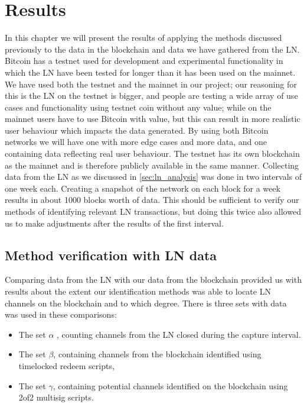 \chapter{Results}
\label{chap:results}

In this chapter we will present the results of applying the methods discussed previously to the data in the blockchain and data we have gathered from the LN. Bitcoin has a testnet used for development and experimental functionality in which the LN have been tested for longer than it has been used on the mainnet. We have used both the testnet and the mainnet in our project; our reasoning for this is the LN on the testnet is bigger, and people are testing a wide array of use cases and functionality using testnet coin without any value; while on the mainnet users have to use Bitcoin with value, but this can result in more realistic user behaviour which impacts the data generated.
By using both Bitcoin networks we will have one with more edge cases and more data, and one containing data reflecting real user behaviour.
The testnet has its own blockchain as the mainnet and is therefore publicly available in the same manner. Collecting data from the LN as we discussed in \cref{sec:ln_analysis} was done in two intervals of one week each. Creating a snapshot of the network on each block for a week results in about 1000 blocks worth of data. This should be sufficient to verify our methods of identifying relevant LN transactions, but doing this twice also allowed us to make adjustments after the results of the first interval.

\section{Method verification with LN data}

Comparing data from the LN with our data from the blockchain provided us with results about the extent our identification methods was able to locate LN channels on the blockchain and to which degree. There is three sets with data was used in these comparisons: 
\begin{itemize}
    \item The set \( \alpha \) , counting channels from the LN closed during the capture interval. 
    \item The set \( \beta \), containing channels from the blockchain identified using timelocked redeem scripts,
    \item The set  \( \gamma \), containing potential channels identified on the blockchain using 2of2 multisig scripts.
\end{itemize}

